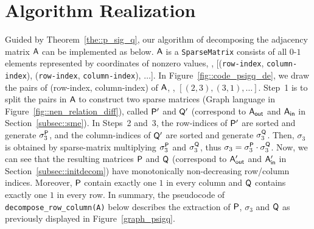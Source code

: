  
\section{Algorithm Realization}
\label{sec::alg}

Guided by Theorem~\ref{the::p_sig_q}, our algorithm of decomposing the adjacency matrix $\mathsf{A}$ can be implemented as below.
$\mathsf{A}$ is a \texttt{SparseMatrix} consists of all $0$-$1$ elements represented by coordinates of nonzero values,
\ie, [(\texttt{row-index}, \texttt{column-index}), (\texttt{row-index}, \texttt{column-index}), $\ldots$].
In Figure~\ref{fig::code_psigq_de}, we draw the pairs of (row-index, column-index) of $\mathsf{A}$, \eg, $[(2, 3), (3, 1), \ldots]$.
Step~1 is to split the pairs in $\mathsf{A}$ to construct two sparse matrices (Graph language in Figure~\ref{fig::nen_relation_diff}), called $\mathsf{P}'$ and $\mathsf{Q}'$ (correspond to $\mathsf{A}_{\mathsf{out}}$ and $\mathsf{A}_{\mathsf{in}}$ in Section~\ref{subsec::sme}).
In Steps~2 and~3, the row-indices of $\mathsf{P}'$ are sorted and generate $\sigma_3^{\mathsf{P}}$, and the column-indices of $\mathsf{Q}'$ are sorted and generate $\sigma_3^{\mathsf{Q}}$.
Then, $\sigma_3$ is obtained by sparse-matrix multiplying $\sigma_3^{\mathsf{P}}$ and $\sigma_3^{\mathsf{Q}}$, thus $\sigma_3=\sigma_3^{\mathsf{P}}\cdot\sigma_3^{\mathsf{Q}}$.
Now, we can see that the resulting matrices $\mathsf{P}$ and $\mathsf{Q}$ (correspond to $\mathsf{A}_{\mathsf{out}}'$ and $\mathsf{A}_{\mathsf{in}}'$ in Section~\ref{subsec::initdecom}) have monotonically non-decreasing row/column indices.
Moreover, $\mathsf{P}$ contain exactly one $1$ in every column and $\mathsf{Q}$ contains exactly one $1$ in every row.
In summary, the pseudocode of \texttt{decompose\_row\_column(A)} below describes the extraction of $\mathsf{P}$, $\sigma_3$ and $\mathsf{Q}$ as previously displayed in Figure~\ref{graph_psigq}.



